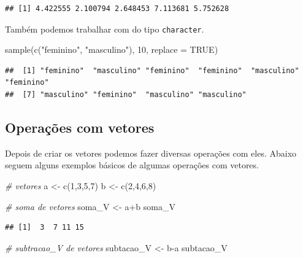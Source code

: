 \documentclass[
]{book}
\newenvironment{Shaded}{\begin{snugshade}}{\end{snugshade}}
\newcommand{\AttributeTok}[1]{\textcolor[rgb]{0.77,0.63,0.00}{#1}}
\newcommand{\CommentTok}[1]{\textcolor[rgb]{0.56,0.35,0.01}{\textit{#1}}}
\newcommand{\ConstantTok}[1]{\textcolor[rgb]{0.00,0.00,0.00}{#1}}
\newcommand{\DecValTok}[1]{\textcolor[rgb]{0.00,0.00,0.81}{#1}}
\newcommand{\FunctionTok}[1]{\textcolor[rgb]{0.00,0.00,0.00}{#1}}
\newcommand{\NormalTok}[1]{#1}
\newcommand{\OtherTok}[1]{\textcolor[rgb]{0.56,0.35,0.01}{#1}}
\newcommand{\SpecialCharTok}[1]{\textcolor[rgb]{0.00,0.00,0.00}{#1}}
\newcommand{\StringTok}[1]{\textcolor[rgb]{0.31,0.60,0.02}{#1}}
\begin{document}
\begin{verbatim}
## [1] 4.422555 2.100794 2.648453 7.113681 5.752628
\end{verbatim}

Também podemos trabalhar com do tipo \texttt{character}.

\begin{Shaded}
\begin{Highlighting}[]
\FunctionTok{sample}\NormalTok{(}\FunctionTok{c}\NormalTok{(}\StringTok{"feminino"}\NormalTok{, }\StringTok{"masculino"}\NormalTok{), }\DecValTok{10}\NormalTok{, }\AttributeTok{replace =} \ConstantTok{TRUE}\NormalTok{)}
\end{Highlighting}
\end{Shaded}

\begin{verbatim}
##  [1] "feminino"  "masculino" "feminino"  "feminino"  "masculino" "feminino" 
##  [7] "masculino" "feminino"  "masculino" "masculino"
\end{verbatim}

\hypertarget{operauxe7uxf5es-com-vetores}{%
\subsection{Operações com vetores}\label{operauxe7uxf5es-com-vetores}}

Depois de criar os vetores podemos fazer diversas operações com eles. Abaixo seguem alguns exemplos básicos de algumas operações com vetores.

\begin{Shaded}
\begin{Highlighting}[]
\CommentTok{\# vetores}
\NormalTok{a }\OtherTok{\textless{}{-}} \FunctionTok{c}\NormalTok{(}\DecValTok{1}\NormalTok{,}\DecValTok{3}\NormalTok{,}\DecValTok{5}\NormalTok{,}\DecValTok{7}\NormalTok{)}
\NormalTok{b }\OtherTok{\textless{}{-}} \FunctionTok{c}\NormalTok{(}\DecValTok{2}\NormalTok{,}\DecValTok{4}\NormalTok{,}\DecValTok{6}\NormalTok{,}\DecValTok{8}\NormalTok{)}

\CommentTok{\# soma de vetores}
\NormalTok{soma\_V }\OtherTok{\textless{}{-}}\NormalTok{ a}\SpecialCharTok{+}\NormalTok{b}
\NormalTok{soma\_V}
\end{Highlighting}
\end{Shaded}

\begin{verbatim}
## [1]  3  7 11 15
\end{verbatim}

\begin{Shaded}
\begin{Highlighting}[]
\CommentTok{\# subtracao\_V de vetores}
\NormalTok{subtacao\_V }\OtherTok{\textless{}{-}}\NormalTok{ b}\SpecialCharTok{{-}}\NormalTok{a}
\NormalTok{subtacao\_V}
\end{Highlighting}
\end{Shaded}
\end{document}
